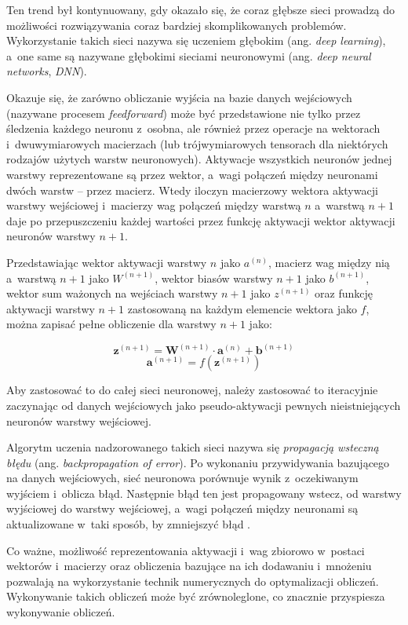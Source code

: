 Ten trend był kontynuowany, gdy okazało się, że coraz głębsze sieci prowadzą do możliwości rozwiązywania coraz bardziej skomplikowanych problemów.
Wykorzystanie takich sieci nazywa się uczeniem głębokim (ang. \emph{deep learning}), a~one same są nazywane głębokimi sieciami neuronowymi (ang. \emph{deep neural networks}, \emph{DNN}).

Okazuje się, że zarówno obliczanie wyjścia na bazie danych wejściowych (nazywane procesem \emph{feedforward}) może być przedstawione nie tylko przez śledzenia każdego neuronu z~osobna, ale również przez operacje na wektorach i~dwuwymiarowych macierzach (lub trójwymiarowych tensorach dla niektórych rodzajów użytych warstw neuronowych).
Aktywacje wszystkich neuronów jednej warstwy reprezentowane są przez wektor, a~wagi połączeń między neuronami dwóch warstw -- przez macierz.
Wtedy iloczyn macierzowy wektora aktywacji warstwy wejściowej i~macierzy wag połączeń między warstwą $n$ a~warstwą $n+1$ daje po przepuszczeniu każdej wartości przez funkcję aktywacji wektor aktywacji neuronów warstwy $n+1$.

Przedstawiając wektor aktywacji warstwy $n$ jako $a^{(n)}$, macierz wag między nią a~warstwą $n+1$ jako $W^{(n+1)}$, wektor biasów warstwy $n+1$ jako $b^{(n+1)}$, wektor sum ważonych na wejściach warstwy $n+1$ jako $z^{(n+1)}$ oraz funkcję aktywacji warstwy $n+1$ zastosowaną na każdym elemencie wektora jako $f$, można zapisać pełne obliczenie dla warstwy $n+1$ jako:

\[
  \mathbf{z}^{(n+1)} = \mathbf{W}^{(n+1)} \cdot \mathbf{a}^{(n)} + \mathbf{b}^{(n+1)}
\]
\[
  \mathbf{a}^{(n+1)} = f(\mathbf{z}^{(n+1)})
\]

Aby zastosować to do całej sieci neuronowej, należy zastosować to iteracyjnie zaczynając od danych wejściowych jako pseudo-aktywacji pewnych nieistniejących neuronów warstwy wejściowej.

Algorytm uczenia nadzorowanego takich sieci nazywa się \emph{propagacją wsteczną błędu} (ang. \emph{backpropagation of error}).
Po wykonaniu przywidywania bazującego na danych wejściowych, sieć neuronowa porównuje wynik z~oczekiwanym wyjściem i~oblicza błąd.
Następnie błąd ten jest propagowany wstecz, od warstwy wyjściowej do warstwy wejściowej, a~wagi połączeń między neuronami są aktualizowane w~taki sposób, by zmniejszyć błąd \cite{rojas1996backpropagation}.

Co ważne, możliwość reprezentowania aktywacji i~wag zbiorowo w~postaci wektorów i~macierzy oraz obliczenia bazujące na ich dodawaniu i~mnożeniu pozwalają na wykorzystanie technik numerycznych do optymalizacji obliczeń.
Wykonywanie takich obliczeń może być zrównoleglone, co znacznie przyspiesza wykonywanie obliczeń.

